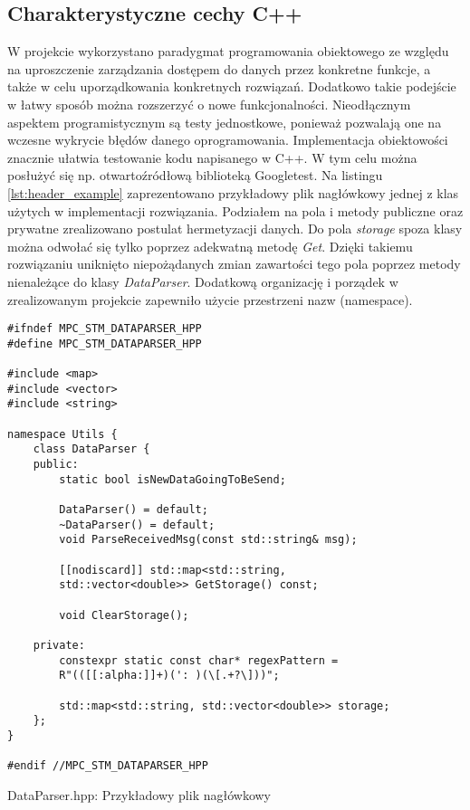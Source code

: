 \subsection{Charakterystyczne cechy C++} \label{sec:cpp_details}
W projekcie wykorzystano paradygmat programowania obiektowego ze względu na uproszczenie zarządzania
dostępem do danych przez konkretne funkcje, a także w celu uporządkowania konkretnych rozwiązań.
Dodatkowo takie podejście w łatwy sposób można rozszerzyć o nowe funkcjonalności. Nieodłącznym 
aspektem programistycznym są testy jednostkowe, ponieważ pozwalają one na wczesne wykrycie błędów
danego oprogramowania. Implementacja obiektowości znacznie ułatwia testowanie kodu napisanego w C++.
W tym celu można posłużyć się np. otwartoźródłową biblioteką Googletest. Na listingu
\ref{lst:header_example} zaprezentowano przykładowy plik nagłówkowy jednej z klas użytych w
implementacji rozwiązania. Podziałem na pola i metody publiczne oraz prywatne zrealizowano
postulat hermetyzacji danych. Do pola \textit{storage} spoza klasy można odwołać się tylko poprzez
adekwatną metodę \textit{Get}. Dzięki takiemu rozwiązaniu uniknięto niepożądanych zmian zawartości
tego pola poprzez metody nienależące do klasy \textit{DataParser}. Dodatkową organizację i porządek
w zrealizowanym projekcie zapewniło użycie przestrzeni nazw (namespace). 
\begin{listing}[htb]
\begin{verbatim}
#ifndef MPC_STM_DATAPARSER_HPP
#define MPC_STM_DATAPARSER_HPP

#include <map>
#include <vector>
#include <string>

namespace Utils {
    class DataParser {
    public:
        static bool isNewDataGoingToBeSend;

        DataParser() = default;
        ~DataParser() = default;
        void ParseReceivedMsg(const std::string& msg);

        [[nodiscard]] std::map<std::string,
        std::vector<double>> GetStorage() const;
        
        void ClearStorage();

    private:
        constexpr static const char* regexPattern = 
        R"(([[:alpha:]]+)(': )(\[.+?\]))";

        std::map<std::string, std::vector<double>> storage;
    };
}

#endif //MPC_STM_DATAPARSER_HPP
\end{verbatim}
\caption{DataParser.hpp: Przykładowy plik nagłówkowy}
\label{lst:header_example}
\end{listing}

